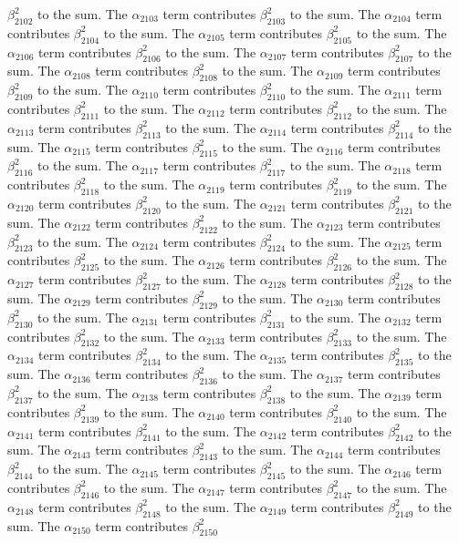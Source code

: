 \begin{lemma}
$\beta_{2102}^{2}$ to the sum. The $\alpha_{2103}$ term contributes $\beta_{2103}^{2}$ to the sum. The $\alpha_{2104}$ term contributes $\beta_{2104}^{2}$ to the sum. The $\alpha_{2105}$ term contributes $\beta_{2105}^{2}$ to the sum. The $\alpha_{2106}$ term contributes $\beta_{2106}^{2}$ to the sum. The $\alpha_{2107}$ term contributes $\beta_{2107}^{2}$ to the sum. The $\alpha_{2108}$ term contributes $\beta_{2108}^{2}$ to the sum. The $\alpha_{2109}$ term contributes $\beta_{2109}^{2}$ to the sum. The $\alpha_{2110}$ term contributes $\beta_{2110}^{2}$ to the sum. The $\alpha_{2111}$ term contributes $\beta_{2111}^{2}$ to the sum. The $\alpha_{2112}$ term contributes $\beta_{2112}^{2}$ to the sum. The $\alpha_{2113}$ term contributes $\beta_{2113}^{2}$ to the sum. The $\alpha_{2114}$ term contributes $\beta_{2114}^{2}$ to the sum. The $\alpha_{2115}$ term contributes $\beta_{2115}^{2}$ to the sum. The $\alpha_{2116}$ term contributes $\beta_{2116}^{2}$ to the sum. The $\alpha_{2117}$ term contributes $\beta_{2117}^{2}$ to the sum. The $\alpha_{2118}$ term contributes $\beta_{2118}^{2}$ to the sum. The $\alpha_{2119}$ term contributes $\beta_{2119}^{2}$ to the sum. The $\alpha_{2120}$ term contributes $\beta_{2120}^{2}$ to the sum. The $\alpha_{2121}$ term contributes $\beta_{2121}^{2}$ to the sum. The $\alpha_{2122}$ term contributes $\beta_{2122}^{2}$ to the sum. The $\alpha_{2123}$ term contributes $\beta_{2123}^{2}$ to the sum. The $\alpha_{2124}$ term contributes $\beta_{2124}^{2}$ to the sum. The $\alpha_{2125}$ term contributes $\beta_{2125}^{2}$ to the sum. The $\alpha_{2126}$ term contributes $\beta_{2126}^{2}$ to the sum. The $\alpha_{2127}$ term contributes $\beta_{2127}^{2}$ to the sum. The $\alpha_{2128}$ term contributes $\beta_{2128}^{2}$ to the sum. The $\alpha_{2129}$ term contributes $\beta_{2129}^{2}$ to the sum. The $\alpha_{2130}$ term contributes $\beta_{2130}^{2}$ to the sum. The $\alpha_{2131}$ term contributes $\beta_{2131}^{2}$ to the sum. The $\alpha_{2132}$ term contributes $\beta_{2132}^{2}$ to the sum. The $\alpha_{2133}$ term contributes $\beta_{2133}^{2}$ to the sum. The $\alpha_{2134}$ term contributes $\beta_{2134}^{2}$ to the sum. The $\alpha_{2135}$ term contributes $\beta_{2135}^{2}$ to the sum. The $\alpha_{2136}$ term contributes $\beta_{2136}^{2}$ to the sum. The $\alpha_{2137}$ term contributes $\beta_{2137}^{2}$ to the sum. The $\alpha_{2138}$ term contributes $\beta_{2138}^{2}$ to the sum. The $\alpha_{2139}$ term contributes $\beta_{2139}^{2}$ to the sum. The $\alpha_{2140}$ term contributes $\beta_{2140}^{2}$ to the sum. The $\alpha_{2141}$ term contributes $\beta_{2141}^{2}$ to the sum. The $\alpha_{2142}$ term contributes $\beta_{2142}^{2}$ to the sum. The $\alpha_{2143}$ term contributes $\beta_{2143}^{2}$ to the sum. The $\alpha_{2144}$ term contributes $\beta_{2144}^{2}$ to the sum. The $\alpha_{2145}$ term contributes $\beta_{2145}^{2}$ to the sum. The $\alpha_{2146}$ term contributes $\beta_{2146}^{2}$ to the sum. The $\alpha_{2147}$ term contributes $\beta_{2147}^{2}$ to the sum. The $\alpha_{2148}$ term contributes $\beta_{2148}^{2}$ to the sum. The $\alpha_{2149}$ term contributes $\beta_{2149}^{2}$ to the sum. The $\alpha_{2150}$ term contributes $\beta_{2150}^{2}$ 
\end{lemma}
